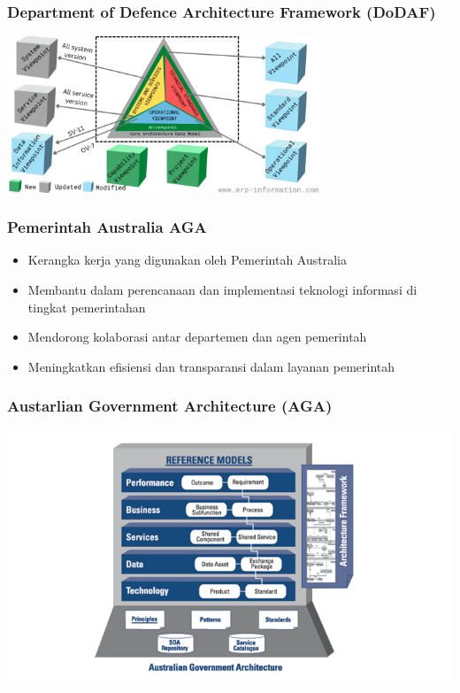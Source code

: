 \documentclass[aspectratio=169, table]{beamer}
\begin{document}
	{
		\begin{frame}
			\frametitle{Department of Defence Architecture Framework (DoDAF)}
			\begin{center}
				\includegraphics[width=0.7\textwidth]{../figures/dodaf}
			\end{center}
		\end{frame}
	}
	
	\begin{frame}
		\frametitle{Pemerintah Australia AGA}
		\begin{itemize}
			\item Kerangka kerja yang digunakan oleh Pemerintah Australia
			\item Membantu dalam perencanaan dan implementasi teknologi informasi di tingkat pemerintahan
			\item Mendorong kolaborasi antar departemen dan agen pemerintah
			\item Meningkatkan efisiensi dan transparansi dalam layanan pemerintah
		\end{itemize}
	\end{frame}
	
	{
		\begin{frame}
			\frametitle{Austarlian Government Architecture (AGA)}
			\begin{center}
				\includegraphics[width=1.1\textwidth]{../figures/aga}
			\end{center}
		\end{frame}
	}
	
\end{document}

